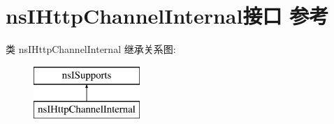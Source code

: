 \hypertarget{interfacens_i_http_channel_internal}{}\section{ns\+I\+Http\+Channel\+Internal接口 参考}
\label{interfacens_i_http_channel_internal}
类 ns\+I\+Http\+Channel\+Internal 继承关系图\+:\begin{figure}[H]
\begin{center}
\leavevmode
\includegraphics[height=2.000000cm]{interfacens_i_http_channel_internal}
\end{center}
\end{figure}
